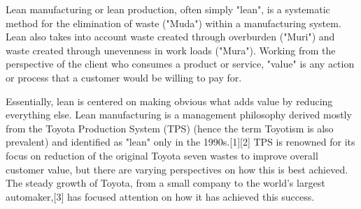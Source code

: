 Lean manufacturing or lean production, often simply "lean", is a systematic method for the elimination of waste ("Muda") within a manufacturing system. Lean also takes into account waste created through overburden ("Muri") and waste created through unevenness in work loads ("Mura"). Working from the perspective of the client who consumes a product or service, "value" is any action or process that a customer would be willing to pay for.

Essentially, lean is centered on making obvious what adds value by reducing everything else. Lean manufacturing is a management philosophy derived mostly from the Toyota Production System (TPS) (hence the term Toyotism is also prevalent) and identified as "lean" only in the 1990s.[1][2] TPS is renowned for its focus on reduction of the original Toyota seven wastes to improve overall customer value, but there are varying perspectives on how this is best achieved. The steady growth of Toyota, from a small company to the world's largest automaker,[3] has focused attention on how it has achieved this success.
